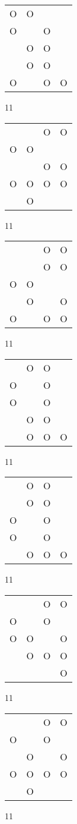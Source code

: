 \begin{tabular}{|m{0.2cm}m{0.2cm}m{0.2cm}m{0.2cm}|}\hline
O&O& & \\
O& &O& \\
 &O&O& \\
 &O&O& \\
O& &O&O\\
\hline\end{tabular}11
\begin{tabular}{|m{0.2cm}m{0.2cm}m{0.2cm}m{0.2cm}|}\hline
 & &O&O\\
O&O& & \\
 & &O&O\\
O&O&O&O\\
 &O& & \\
\hline\end{tabular}11
\begin{tabular}{|m{0.2cm}m{0.2cm}m{0.2cm}m{0.2cm}|}\hline
 & &O&O\\
 & &O&O\\
O&O& & \\
 &O& &O\\
O& &O&O\\
\hline\end{tabular}11
\begin{tabular}{|m{0.2cm}m{0.2cm}m{0.2cm}m{0.2cm}|}\hline
 &O&O& \\
O& &O& \\
O& &O& \\
 &O&O& \\
 &O&O&O\\
\hline\end{tabular}11
\begin{tabular}{|m{0.2cm}m{0.2cm}m{0.2cm}m{0.2cm}|}\hline
 &O&O& \\
 &O&O& \\
O& &O& \\
O& &O& \\
 &O&O&O\\
\hline\end{tabular}11
\begin{tabular}{|m{0.2cm}m{0.2cm}m{0.2cm}m{0.2cm}|}\hline
 & &O&O\\
O& &O& \\
O&O& &O\\
 &O&O&O\\
 & & &O\\
\hline\end{tabular}11
\begin{tabular}{|m{0.2cm}m{0.2cm}m{0.2cm}m{0.2cm}|}\hline
 & &O&O\\
O& &O& \\
 &O& &O\\
O&O&O&O\\
 &O& & \\
\hline\end{tabular}11
